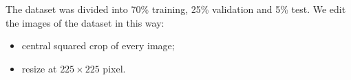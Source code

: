The dataset was divided into 70\% training, 25\% validation and 5\% test.
We edit the images of the dataset in this way:

\begin{itemize}
    \item central squared crop of every image;
    \item resize at $225 \times 225$ pixel.
\end{itemize}





